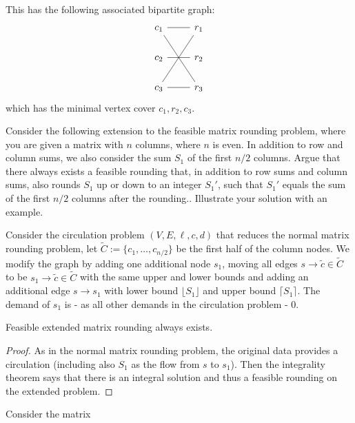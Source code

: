 \documentclass{article}
\begin{document}
\begin{solving}
\begin{example}
        This has the following associated bipartite graph:\begin{equation*}
            \begin{tikzcd}
            c_1\arrow[r, no head] \arrow[rdd, no head]&r_1\\
            c_2\arrow[r, no head]&r_2\\
            c_3\arrow[r, no head]\arrow[ruu, no head]&r_3
            \end{tikzcd}
        \end{equation*}
        which has the minimal vertex cover $c_1, r_2, c_3$. 
    \end{example}
\end{solving}
\newpage

\begin{exercise}
Consider the following extension to the feasible matrix rounding problem, where you are given a matrix with $n$ columns, where $n$ is even. In addition to row and column sums, we also consider the sum $S_1$ of the first $n/2$ columns. Argue that there always exists a feasible rounding that, in addition to row sums and column sums, also rounds $S_1$ up or down to an integer $S_1'$, such that $S_1'$ equals the sum of the first $n/2$ columns after the rounding.. Illustrate your solution with an example.    
\end{exercise}

\begin{solving}
Consider the circulation problem $(V,E,\ell, c, d)$ that reduces the normal matrix rounding problem, let $\tilde C :=\{c_1, \dots, c_{n/2}\}$ be the first half of the column nodes. We modify the graph by adding one additional node $s_1$, moving all edges $s\to \tilde c \in \tilde C$ to be $s_1\to \tilde c\in \tilde C$ with the same upper and lower bounds and adding an additional edge $s\to s_1$ with lower bound $\lfloor S_1\rfloor$ and upper bound $\lceil S_1\rceil$. The demand of $s_1$ is - as all other demands in the circulation problem - $0$.

\begin{theorem}
    Feasible extended matrix rounding always exists.
\end{theorem}
\begin{proof}
    As in the normal matrix rounding problem, the original data provides a circulation (including also $S_1$ as the flow from $s$ to $s_1$). Then the integrality theorem says that there is an integral solution and thus a feasible rounding on the extended problem.
\end{proof}

\begin{example}
    Consider the matrix \be
\end{example}

\end{solving}
\end{document}
